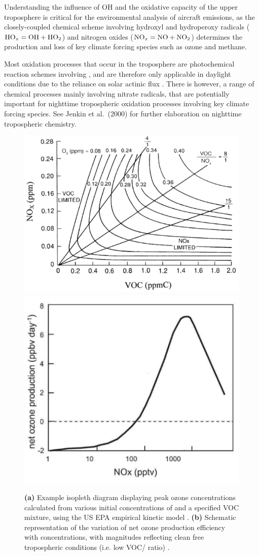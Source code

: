 

Understanding the influence of OH and the oxidative capacity of the upper troposphere is critical for the environmental analysis of aircraft emissions, as the closely-coupled chemical scheme involving hydroxyl and hydroperoxy radicals ($\ce{HO_x} = \ce{OH} + \ce{HO_2}$) and nitrogen oxides ($\ce{NO_x} = \ce{NO} + \ce{NO_2}$) determines the production and loss of key climate forcing species such as ozone and methane.

Most oxidation processes that occur in the troposphere are photochemical reaction schemes involving , and are therefore only applicable in daylight conditions due to the reliance on solar actinic flux \cite{Jacobson2005}. There is however, a range of chemical processes mainly involving nitrate radicals, that are potentially important for nighttime tropospheric oxidation processes involving key climate forcing species. See Jenkin et al.\ (2000) \cite{Jenkin2000} for further elaboration on nighttime tropospheric chemistry.

\begin{figure}[H]
	\centering
	\subfloat
		{
		\includegraphics[width=.38\textwidth]{NOx-VOC_curve.png}
		\vspace{.2cm}
		\label{NO_x_VOC}
		}
	\subfloat
		{
		\includegraphics[width=.32\textwidth]{NO_x_ozone.png}
		\label{NO_x_ozone}
		}
	\caption{\textbf{(a)} Example isopleth diagram displaying peak ozone concentrations calculated from various initial concentrations of  and a specified VOC mixture, using the US EPA empirical kinetic model \cite{Dodge1977, Jenkin2000}. \textbf{(b)} Schematic representation of the variation of net ozone production efficiency with  concentrations, with magnitudes reflecting clean free tropospheric conditions (i.e. low VOC/ ratio) \cite{Monks2005}.}
	\label{}
\end{figure}

